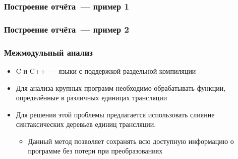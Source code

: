 \documentclass[hyperref={pdfpagelabels=false}]{beamer}
\begin{document}
\begin{frame}
\frametitle{Построение отчёта~--- пример 1}
\begin{figure}[H]
\end{figure}
\end{frame}

\begin{frame}
\frametitle{Построение отчёта~--- пример 2}
\begin{figure}[h]
\end{figure}
\end{frame}

\begin{frame}
\frametitle{Межмодульный анализ}
\begin{itemize}
  \item C и C++~--- языки с поддержкой раздельной компиляции
  \item Для анализа крупных программ необходимо обрабатывать функции, определённые в различных единицах трансляции
  \item Для решения этой проблемы предлагается использовать слияние синтаксических деревьев единиц трансляции.
    \begin{itemize}
      \item Данный метод позволяет сохранять всю доступную информацию о программе без потери при преобразованиях
    \end{itemize}
\end{itemize}
\end{frame}
\end{document}
